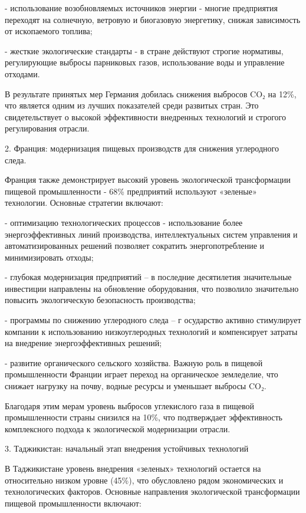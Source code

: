 \begin{multicols}{2}
- использование возобновляемых источников энергии - многие предприятия
переходят на солнечную, ветровую и биогазовую энергетику, снижая
зависимость от ископаемого топлива;

- жесткие экологические стандарты - в стране действуют строгие
нормативы, регулирующие выбросы парниковых газов, использование воды и
управление отходами.

В результате принятых мер Германия добилась снижения выбросов CO₂ на
12\%, что является одним из лучших показателей среди развитых стран. Это
свидетельствует о высокой эффективности внедренных технологий и строгого
регулирования отрасли.

2. Франция: модернизация пищевых производств для снижения углеродного
следа.

Франция также демонстрирует высокий уровень экологической трансформации
пищевой промышленности - 68\% предприятий используют «зеленые»
технологии. Основные стратегии включают:

- оптимизацию технологических процессов - использование более
энергоэффективных линий производства, интеллектуальных систем управления
и автоматизированных решений позволяет сократить энергопотребление и
минимизировать отходы;

- глубокая модернизация предприятий -- в последние десятилетия
значительные инвестиции направлены на обновление оборудования, что
позволило значительно повысить экологическую безопасность производства;

- программы по снижению углеродного следа -- г осударство активно
стимулирует компании к использованию низкоуглеродных технологий и
компенсирует затраты на внедрение энергоэффективных решений;

- развитие органического сельского хозяйства. Важную роль в пищевой
промышленности Франции играет переход на органическое земледелие, что
снижает нагрузку на почву, водные ресурсы и уменьшает выбросы CO₂.

Благодаря этим мерам уровень выбросов углекислого газа в пищевой
промышленности страны снизился на 10\%, что подтверждает эффективность
комплексного подхода к экологической модернизации отрасли.

3. Таджикистан: начальный этап внедрения устойчивых технологий

В Таджикистане уровень внедрения «зеленых» технологий остается на
относительно низком уровне (45\%), что обусловлено рядом экономических и
технологических факторов. Основные направления экологической
трансформации пищевой промышленности включают:


\end{multicols}
